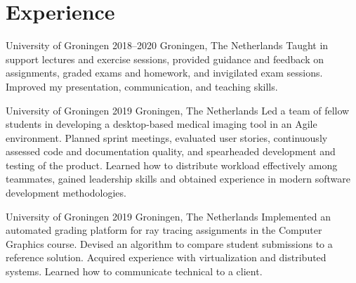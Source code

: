 \section*{Experience}

{University of Groningen} %
{2018--2020} %
{Groningen, The Netherlands} %
{%
	Taught in support lectures and exercise sessions, provided guidance and feedback on assignments, graded exams and homework, and invigilated exam sessions.
	Improved my presentation, communication, and teaching skills.
}

{University of Groningen} %
{2019} %
{Groningen, The Netherlands} %
{%
	Led a team of fellow students in developing a desktop-based medical imaging tool in an Agile environment. Planned sprint meetings, evaluated user stories, continuously assessed code and documentation quality, and spearheaded development and testing of the product. Learned how to distribute workload effectively among teammates, gained leadership skills and obtained experience in modern software development methodologies.
}

{University of Groningen} %
{2019} %
{Groningen, The Netherlands} %
{
	Implemented an automated grading platform for ray tracing assignments in the Computer Graphics course. Devised an algorithm to compare student submissions to a reference solution. Acquired experience with virtualization and distributed systems. Learned how to communicate technical to a client.
}
